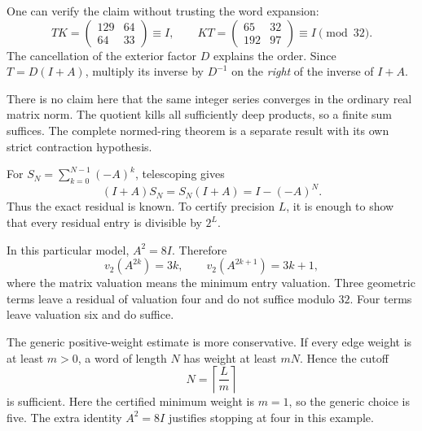 
One can verify the claim without trusting the word expansion:
\[
TK=\begin{pmatrix}129&64\\64&33\end{pmatrix}\equiv I,
\qquad
KT=\begin{pmatrix}65&32\\192&97\end{pmatrix}\equiv I\pmod{32}.
\]
The cancellation of the exterior factor $D$ explains the order. Since $T=D(I+A)$, multiply its inverse by $D^{-1}$ on the \emph{right} of the inverse of $I+A$.

There is no claim here that the same integer series converges in the ordinary real matrix norm. The quotient kills all sufficiently deep products, so a finite sum suffices. The complete normed-ring theorem is a separate result with its own strict contraction hypothesis.


For $S_N=\sum_{k=0}^{N-1}(-A)^k$, telescoping gives
\[
(I+A)S_N=S_N(I+A)=I-(-A)^N.
\]
Thus the exact residual is known. To certify precision $L$, it is enough to show that every residual entry is divisible by $2^L$.


In this particular model, $A^2=8I$. Therefore
\[
v_2(A^{2k})=3k,\qquad v_2(A^{2k+1})=3k+1,
\]
where the matrix valuation means the minimum entry valuation. Three geometric terms leave a residual of valuation four and do not suffice modulo $32$. Four terms leave valuation six and do suffice.

The generic positive-weight estimate is more conservative. If every edge weight is at least $m>0$, a word of length $N$ has weight at least $mN$. Hence the cutoff
\[
N=\left\lceil\frac Lm\right\rceil
\]
is sufficient. Here the certified minimum weight is $m=1$, so the generic choice is five. The extra identity $A^2=8I$ justifies stopping at four in this example.

